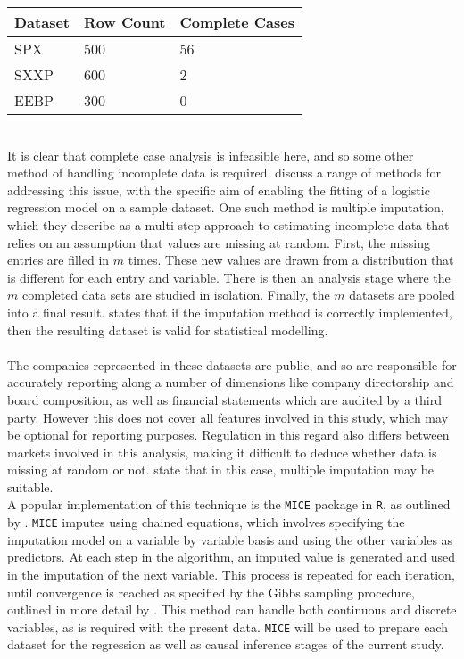 {\begin{table}[h!]
\centering
\begin{tabular}{ |p{3cm}||p{3cm}|p{3cm}|  }
 \hline
 Dataset & Row Count & Complete Cases\\
 \hline
 SPX & 500 & 56  \\
 SXXP &   600  &  2 \\
 EEBP & 300 & 0  \\
 \hline
\end{tabular}
\end{table}\\
It is clear that complete case analysis is infeasible here, and so some other method of handling incomplete data is required. \cite{hortonMissing} discuss a range of methods for addressing this issue, with the specific aim of enabling the fitting of a logistic regression model on a sample dataset. One such method is multiple imputation, which they describe as a multi-step approach to estimating incomplete data that relies on an assumption that values are missing at random. First, the missing entries are filled in $m$ times. These new values are drawn from a distribution that is different for each entry and variable. There is then an analysis stage where the $m$ completed data sets are studied in isolation. Finally, the $m$ datasets are pooled into a final result. \cite{rubin2004multiple} states that if the imputation method is correctly implemented, then the resulting dataset is valid for statistical modelling.   \\\\
The companies represented in these datasets are public, and so are responsible for accurately reporting along a number of dimensions like company directorship and board composition, as well as financial statements which are audited by a third party. However this does not cover all features involved in this study, which may be optional for reporting purposes. Regulation in this regard also differs between markets involved in this analysis, making it difficult to deduce whether data is missing at random or not. \cite{jakobsen2017and} state that in this case, multiple imputation may be suitable. \\
A popular implementation of this technique is the \texttt{MICE} package in \texttt{R}, as outlined by \cite{mice}. \texttt{MICE} imputes using chained equations, which involves specifying the imputation model on a variable by variable basis and using the other variables as predictors. At each step in the algorithm, an imputed value is generated and used in the imputation of the next variable. This process is repeated for each iteration, until convergence is reached as specified by the Gibbs sampling procedure, outlined in more detail by \cite{yildirimGibbs}. This method can handle both continuous and discrete variables, as is required with the present data. \texttt{MICE} will be used to prepare each dataset for the regression as well as causal inference stages of the current study. 
}
